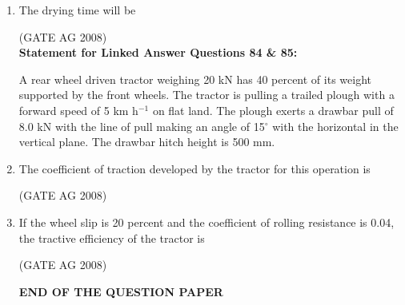 \documentclass[journal,12pt,onecolumn]{IEEEtran}
\begin{document}
\begin{enumerate}
\medskip

\item 
 The drying time will be
\begin{enumerate}
\end{enumerate}
\hfill(GATE AG 2008)\\

\textbf{Statement for Linked Answer Questions 84 \& 85:}

A rear wheel driven tractor weighing 20 kN has 40 percent of its weight supported by the front wheels. The tractor is pulling a trailed plough with a forward speed of 5 km h$^{-1}$ on flat land. The plough exerts a drawbar pull of 8.0 kN with the line of pull making an angle of 15$^\circ$ with the horizontal in the vertical plane. The drawbar hitch height is 500 mm.


\item 
 The coefficient of traction developed by the tractor for this operation is
\begin{enumerate}
\end{enumerate}
\hfill(GATE AG 2008)\\

\medskip

\item 
 If the wheel slip is 20 percent and the coefficient of rolling resistance is 0.04, the tractive efficiency of the tractor is
\begin{enumerate}
\end{enumerate}
\hfill(GATE AG 2008)\\

\medskip

\begin{center}
\textbf{END OF THE QUESTION PAPER}
\end{center}

\end{enumerate}
\end{document}
